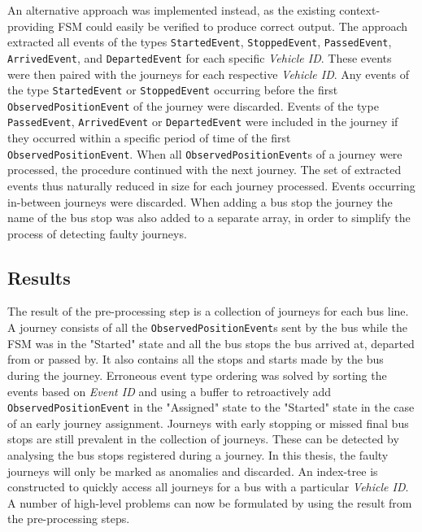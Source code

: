 An alternative approach was implemented instead, as the existing context-providing FSM could easily be verified to produce correct output.
The approach extracted all events of the types \texttt{StartedEvent}, \texttt{StoppedEvent}, \texttt{PassedEvent}, \texttt{ArrivedEvent}, and \texttt{DepartedEvent} for each specific \textit{Vehicle ID}.
These events were then paired with the journeys for each respective \textit{Vehicle ID}.
Any events of the type \texttt{StartedEvent} or \texttt{StoppedEvent} occurring before the first \texttt{ObservedPositionEvent} of the journey were discarded.
Events of the type \texttt{PassedEvent}, \texttt{ArrivedEvent} or \texttt{DepartedEvent} were included in the journey if they occurred within a specific period of time of the first \texttt{ObservedPositionEvent}. 
When all \texttt{ObservedPositionEvent}s of a journey were processed, the procedure continued with the next journey.
The set of extracted events thus naturally reduced in size for each journey processed.
Events occurring in-between journeys were discarded.
When adding a bus stop the journey the name of the bus stop was also added to a separate array, in order to simplify the process of detecting faulty journeys.

\subsection{Results}
The result of the pre-processing step is a collection of journeys for each bus line.
A journey consists of all the \texttt{ObservedPositionEvent}s sent by the bus while the FSM was in the "Started" state and all the bus stops the bus arrived at, departed from or passed by.
It also contains all the stops and starts made by the bus during the journey.
Erroneous event type ordering was solved by sorting the events based on \textit{Event ID} and using a buffer to retroactively add \texttt{ObservedPositionEvent} in the "Assigned" state to the "Started" state in the case of an early journey assignment.
Journeys with early stopping or missed final bus stops are still prevalent in the collection of journeys.
These can be detected by analysing the bus stops registered during a journey.
In this thesis, the faulty journeys will only be marked as anomalies and discarded.
An index-tree is constructed to quickly access all journeys for a bus with a particular \textit{Vehicle ID}.
A number of high-level problems can now be formulated by using the result from the pre-processing steps.

